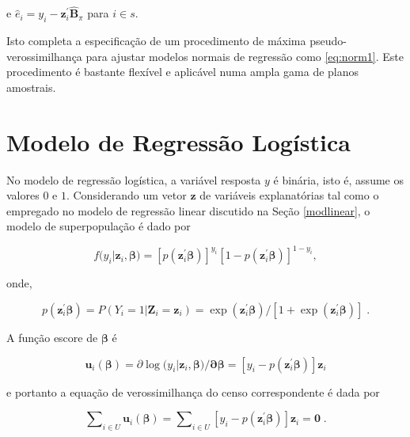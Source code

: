 \documentclass[]{book}
\theoremstyle{definition}
\theoremstyle{definition}
\theoremstyle{definition}
\theoremstyle{remark}
\begin{document}
e
\(\hat{e}_{i}=y_{i}-\mathbf{z}_{i}^{\prime }\widehat{\mathbf{B}}_{\pi }\)
para \(i\in s\).

Isto completa a especificação de um procedimento de máxima
pseudo-verossimilhança para ajustar modelos normais de regressão como
\eqref{eq:norm1}. Este procedimento é bastante flexível e aplicável numa
ampla gama de planos amostrais.

\section{Modelo de Regressão Logística}\label{modlogist}

No modelo de regressão logística, a variável resposta \(y\) é binária,
isto é, assume os valores \(0\) e \(1\). Considerando um vetor
\(\mathbf{z}\) de variáveis explanatórias tal como o empregado no modelo
de regressão linear discutido na Seção \ref{modlinear}, o modelo de
superpopulação é dado por

\begin{equation}
f(y_{i}|\mathbf{z}_{i},\mathbf{\beta )=}\left[ p\left( \mathbf{z}_{i}^{\prime }\mathbf{\beta }\right) \right] ^{y_{i}}\left[ 1-p\left( 
\mathbf{z}_{i}^{\prime }\mathbf{\beta }\right) \right] ^{1-y_{i}},
\label{eq:norm25}
\end{equation}

onde,

\[
p\left( \mathbf{z}_{i}^{\prime }\mathbf{\beta }\right) =P\left( \left.
Y_{i}=1\right| \mathbf{Z}_{i}=\mathbf{z}_{i}\right) =\exp \left( \mathbf{z}_{i}^{\prime }\mathbf{\beta }\right) /\left[ 1+\exp \left( \mathbf{z}
_{i}^{\prime }\mathbf{\beta }\right) \right] \;. 
\]

A função escore de \(\mathbf{\beta }\) é

\begin{equation}
\mathbf{u}_{i}\left( \mathbf{\beta }\right) =\partial \log (y_{i}|\mathbf{z}_{i},\mathbf{\beta )/\partial \beta =}\left[ y_{i}-p\left( \mathbf{z}
_{i}^{\prime }\mathbf{\beta }\right) \right] \mathbf{z}_{i}  \label{eq:norm25a}
\end{equation}

e portanto a equação de verossimilhança do censo correspondente é dada
por

\begin{equation}
\sum\nolimits_{i\in U}\mathbf{u}_{i}\left( \mathbf{\beta }\right)
=\sum\nolimits_{i\in U}\left[ y_{i}-p\left( \mathbf{z}_{i}^{\prime }\mathbf{
\beta }\right) \right] \mathbf{z}_{i}=\mathbf{0\;.}  \label{eq:norm26}
\end{equation}
\end{document}
